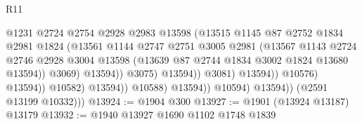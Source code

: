 \begin{lexlean}{R11}
\begin{coremodule}
                                              @1231
                                              @2724
                                              @2754
                                              @2928
                                              @2983
                                              @13598
                                              (@13515
                                                @1145
                                                @87
                                                @2752
                                                @1834
                                                @2981
                                                @1824
                                                (@13561
                                                  @1144
                                                  @2747
                                                  @2751
                                                  @3005
                                                  @2981
                                                  (@13567
                                                    @1143
                                                    @2724
                                                    @2746
                                                    @2928
                                                    @3004
                                                    @13598
                                                    (@13639
                                                      @87
                                                      @2744
                                                      @1834
                                                      @3002
                                                      @1824
                                                      @13680
                                                      @13594))
                                                  @3069)
                                                @13594))
                                            @3075)
                                          @13594))
                                      @3081)
                                    @13594))
                                @10576)
                              @13594))
                          @10582)
                        @13594))
                    @10588)
                  @13594))
              @10594)
            @13594))
        (@2591 @13199 @10332)))
@13924 := @1904 @300
@13927 := @1901 (@13924 @13187) @13179
@13932 := @1940 @13927 @1690 @1102 @1748 @1839

\end{coremodule}
\end{lexlean}
